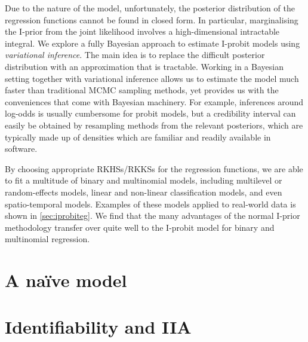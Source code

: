 \documentclass[a4paper,showframe,11pt]{report}
\begin{document}

Due to the nature of the model, unfortunately, the posterior distribution of the regression functions cannot be found in closed form.
In particular, marginalising the I-prior from the joint likelihood involves a high-dimensional intractable integral.
We explore a fully Bayesian approach to estimate I-probit models using \emph{variational inference}.
The main idea is to replace the difficult posterior distribution with an approximation that is tractable.
Working in a Bayesian setting together with variational inference allows us to estimate the model much faster than traditional MCMC sampling methods, yet provides us with the conveniences that come with Bayesian machinery.
For example, inferences around log-odds is usually cumbersome for probit models, but a credibility interval can easily be obtained by resampling methods from the relevant posteriors, which are typically made up of densities which are familiar and readily available in software.

By choosing appropriate RKHSs/RKKSs for the regression functions, we are able to fit a multitude of binary and multinomial models, including multilevel or random-effects models, linear and non-linear classification models, and even spatio-temporal models.
Examples of these models applied to real-world data is shown in  \cref{sec:iprobiteg}.
We find that the many advantages of the normal I-prior methodology  transfer over quite well to the I-probit model for binary and multinomial regression.

\section{A naïve model}\label{sec:iprobitnaive}


%

\section{Identifiability and IIA}\label{sec:iia}

\end{document}
